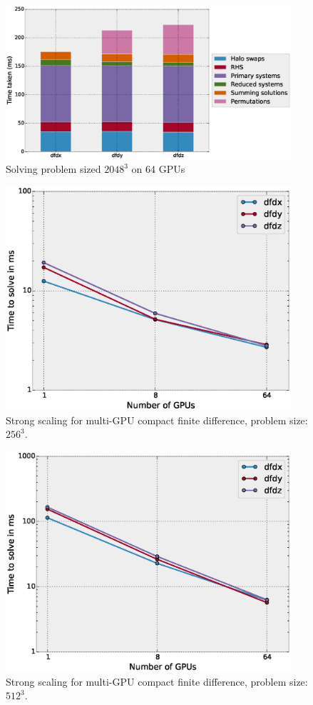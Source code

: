 \documentclass{elsarticle}
\begin{document}
\begin{figure}
\begin{center}
\includegraphics[width=300pt]{fig/profiling-2048-64.eps}
\caption{Solving problem sized $2048^3$ on 64 GPUs}
\label{fig:compact-profiling-2048-64}
\end{center}
\end{figure}

\begin{figure}
\begin{center}
\includegraphics[width=300pt]{fig/strong-scaling-256.eps}
\caption{Strong scaling for multi-GPU compact finite difference, problem size: $256^3$.}
\label{fig:strong-scaling-256}
\end{center}
\end{figure}

\begin{figure}
\begin{center}
\includegraphics[width=300pt]{fig/strong-scaling-512.eps}
\caption{Strong scaling for multi-GPU compact finite difference, problem size: $512^3$.}
\label{fig:strong-scaling-512}
\end{center}
\end{figure}
\end{document}

